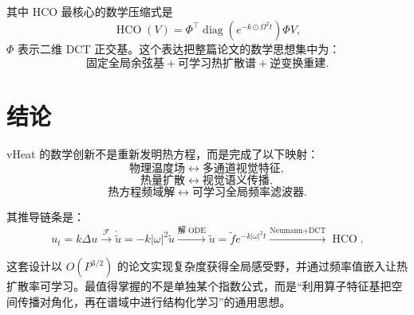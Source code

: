 \documentclass[UTF8,12pt,a4paper,fontset=none]{ctexart}
\numberwithin{equation}{section}
\newcommand{\F}{\mathcal{F}}
\newcommand{\diag}{\operatorname{diag}}
\begin{document}
其中 HCO 最核心的数学压缩式是
\begin{equation}
  \boxed{
  \operatorname{HCO}(V)
  =\Phi^{\top}
  \diag\!\left(e^{-k\odot\Omega^2t}\right)
  \Phi V
  },
\end{equation}
$\Phi$ 表示二维 DCT 正交基。这个表达把整篇论文的数学思想集中为：
\begin{equation}
  \boxed{
  \text{固定全局余弦基}
  +\text{可学习热扩散谱}
  +\text{逆变换重建}
  }.
\end{equation}

\section{结论}

vHeat 的数学创新不是重新发明热方程，而是完成了以下映射：
\begin{equation}
  \text{物理温度场}
  \longleftrightarrow
  \text{多通道视觉特征},
\end{equation}
\begin{equation}
  \text{热量扩散}
  \longleftrightarrow
  \text{视觉语义传播},
\end{equation}
\begin{equation}
  \text{热方程频域解}
  \longleftrightarrow
  \text{可学习全局频率滤波器}.
\end{equation}

其推导链条是：
\begin{equation}
  \boxed{
  u_t=k\Delta u
  \xrightarrow{\F}
  \dot{\widetilde u}=-k|\omega|^2\widetilde u
  \xrightarrow{\text{解 ODE}}
  \widetilde u=\widetilde f e^{-k|\omega|^2t}
  \xrightarrow{\text{Neumann+DCT}}
  \operatorname{HCO}
  }.
\end{equation}

这套设计以 $O(P^{3/2})$ 的论文实现复杂度获得全局感受野，并通过频率值嵌入让热扩散率可学习。最值得掌握的不是单独某个指数公式，而是“利用算子特征基把空间传播对角化，再在谱域中进行结构化学习”的通用思想。
\end{document}
